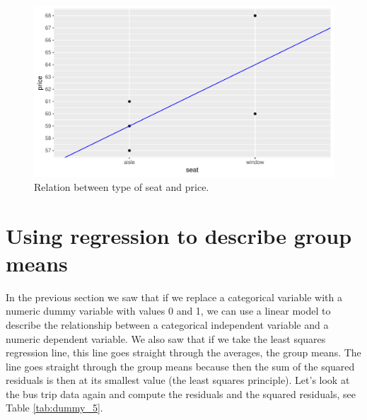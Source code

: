 \documentclass[]{book}\usepackage[]{graphicx}\usepackage[]{color}
\makeatletter
\def\maxwidth{ %
  \ifdim\Gin@nat@width>\linewidth
    \linewidth
  \else
    \Gin@nat@width
  \fi
}
\newenvironment{knitrout}{}{} %
\makeatother
\begin{document}
\begin{knitrout}
\color{fgcolor}\begin{figure}

{\centering \includegraphics[width=\maxwidth]{figure/dummy_4-1} 

}

\caption[Relation between type of seat and price]{Relation between type of seat and price.}\label{fig:dummy_4}
\end{figure}


\end{knitrout}



\section{Using regression to describe group means}

In the previous section we saw that if we replace a categorical variable with a numeric dummy variable with values 0 and 1, we can use a linear model to describe the relationship between a categorical independent variable and a numeric dependent variable. We also saw that if we take the least squares regression line, this line goes straight through the averages, the group means. The line goes straight through the group means because then the sum of the squared residuals is then at its smallest value (the least squares principle).  Let's look at the bus trip data again and compute the residuals and the squared residuals, see Table \ref{tab:dummy_5}.
\end{document}
